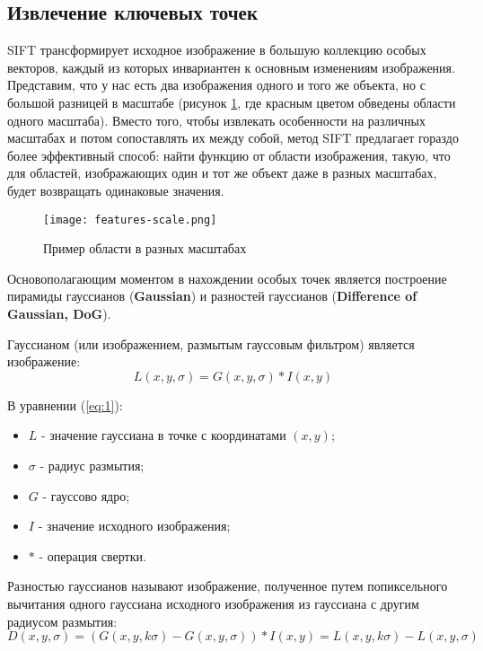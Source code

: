 \subsection{Извлечение ключевых точек}

SIFT трансформирует исходное изображение в большую коллекцию особых векторов, каждый из которых инвариантен к основным изменениям изображения. Представим, что у нас есть два изображения одного и того же объекта, но с большой разницей в масштабе (рисунок \ref{fig:scale}, где красным цветом обведены области одного масштаба). Вместо того, чтобы извлекать особенности на различных масштабах и потом сопоставлять их между собой, метод SIFT предлагает гораздо более эффективный способ: найти функцию от области изображения, такую, что для областей, изображающих один и тот же объект даже в разных масштабах, будет возвращать одинаковые значения.

\begin{figure}[h]
    \centering
    \texttt{[image: features-scale.png]}
    \caption{Пример области в разных масштабах}
    \label{fig:scale}
\end{figure}


Основополагающим моментом в нахождении особых точек является построение пирамиды гауссианов (\textbf{Gaussian}) и разностей гауссианов (\textbf{Difference of Gaussian, DoG}).

Гауссианом (или изображением, размытым гауссовым фильтром) является изображение:
\begin{equation} \label{eq:1}
    L(x,y,\sigma) = G(x,y,\sigma) * I(x,y)
\end{equation}

В уравнении (\ref{eq:1}): 
\begin{itemize}
    \item $L$ - значение гауссиана в точке с координатами $(x,y)$;
    \item $\sigma$ - радиус размытия;
    \item $G$ - гауссово ядро;
    \item $I$ - значение исходного изображения;
    \item $*$ - операция свертки.
\end{itemize}

Разностью гауссианов называют изображение, полученное путем попиксельного вычитания одного гауссиана исходного изображения из гауссиана с другим радиусом размытия:
\begin{equation} \label{eq:2}
    D(x,y,\sigma) = (G(x,y,k\sigma) - G(x,y,\sigma)) * I(x,y) = L(x,y,k\sigma) - L(x,y,\sigma)
\end{equation}

